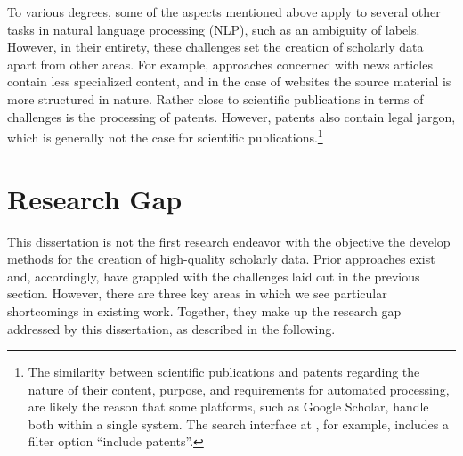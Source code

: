 To various degrees, some of the aspects mentioned above apply to several other tasks in natural language processing (NLP), such as an ambiguity of labels. However, in their entirety, these challenges set the creation of scholarly data apart from other areas. For example, approaches concerned with news articles contain less specialized content, and in the case of websites the source material is more structured in nature. Rather close to scientific publications in terms of challenges is the processing of patents. However, patents also contain legal jargon, which is generally not the case for scientific publications.\footnote{The similarity between scientific publications and patents regarding the nature of their content, purpose, and requirements for automated processing, are likely the reason that some platforms, such as Google Scholar, handle both within a single system. The search interface at , for example, includes a filter option ``include patents''.}


\section{Research Gap}\label{sec:intro-gap}


This dissertation is not the first research endeavor with the objective the develop methods for the creation of high-quality scholarly data. Prior approaches exist and, accordingly, have grappled with the challenges laid out in the previous section. However, there are three key areas in which we see particular shortcomings in existing work. Together, they make up the research gap addressed by this dissertation, as described in the following. %


